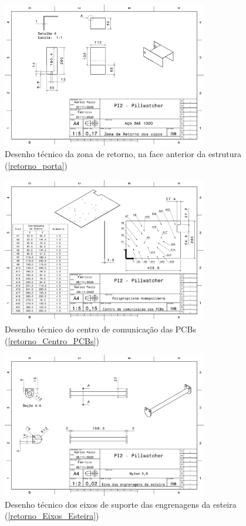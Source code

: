 \begin{apendicesenv}
\begin{figure}[H]
    \centering
    \includegraphics[width=0.8\textwidth]{figuras/estrutura/Desenhos/Zona_retorno.pdf}
    \caption{Desenho técnico da zona de retorno, na face anterior da estrutura (\ref{retorno_porta})}
    \label{fig:zona_retorno}
\end{figure}

\begin{figure}[H]
    \centering
    \includegraphics[width=0.8\textwidth]{figuras/estrutura/Desenhos/Centro_Comunicacao_V3.pdf}
    \caption{Desenho técnico do centro de comunicação das PCBs (\ref{retorno_Centro_PCBs})}
    \label{fig:Centro_PCBs}
\end{figure}

\begin{figure}[H]
    \centering
    \includegraphics[width=0.8\textwidth]{figuras/estrutura/Desenhos/Eixo_Esteira.pdf}
    \caption{Desenho técnico dos eixos de suporte das engrenagens da esteira (\ref{retorno_Eixos_Esteira})}
    \label{fig:Eixos_Esteira}
\end{figure}


\end{apendicesenv}
